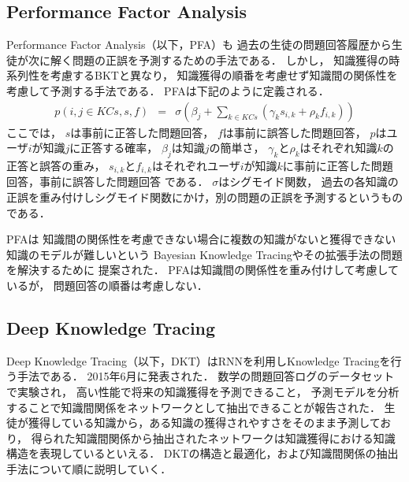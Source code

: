 \subsection{Performance Factor Analysis}
Performance Factor Analysis\cite{pavlik2009performance}（以下，PFA）も
過去の生徒の問題回答履歴から生徒が次に解く問題の正誤を予測するための手法である．
しかし，
知識獲得の時系列性を考慮するBKTと異なり，
知識獲得の順番を考慮せず知識間の関係性を考慮して予測する手法である．
PFAは下記のように定義される．
\begin{eqnarray}
	p(i, j \in KCs, s, f) & = & \sigma( \beta _j + \sum_{k \in KCs}(\gamma_k s_{i, k} + \rho _k f_{i, k}) )
\end{eqnarray}
ここでは，
$s$は事前に正答した問題回答，
$f$は事前に誤答した問題回答，
$p$はユーザ$i$が知識$j$に正答する確率，
$\beta_j$は知識$j$の簡単さ，
$\gamma_k$と$\rho_k$はそれぞれ知識$k$の正答と誤答の重み，
$s_{i, k}$と$f_{i, k}$はそれぞれユーザ$i$が知識$k$に事前に正答した問題回答，事前に誤答した問題回答
である．
$\sigma$はシグモイド関数，
過去の各知識の正誤を重み付けしシグモイド関数にかけ，別の問題の正誤を予測するというものである．

PFAは
知識間の関係性を考慮できない場合に複数の知識がないと獲得できない知識のモデルが難しいという
Bayesian Knowledge Tracingやその拡張手法の問題を解決するために
提案された．
PFAは知識間の関係性を重み付けして考慮しているが，
問題回答の順番は考慮しない．


\subsection{Deep Knowledge Tracing}
Deep Knowledge Tracing\cite{piech2015deep}（以下，DKT）はRNNを利用しKnowledge Tracingを行う手法である．
2015年6月に発表された．
数学の問題回答ログのデータセットで実験され，
高い性能で将来の知識獲得を予測できること，
予測モデルを分析することで知識間関係をネットワークとして抽出できることが報告された．
生徒が獲得している知識から，ある知識の獲得されやすさをそのまま予測しており，
得られた知識間関係から抽出されたネットワークは知識獲得における知識構造を表現しているといえる．
DKTの構造と最適化，および知識間関係の抽出手法について順に説明していく．



